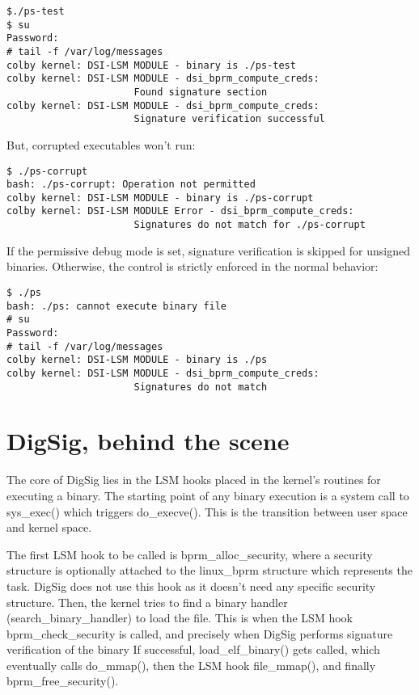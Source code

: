 \documentclass{article}
\begin{document}
\small
\begin{verbatim} 
$./ps-test
$ su
Password:
# tail -f /var/log/messages
colby kernel: DSI-LSM MODULE - binary is ./ps-test
colby kernel: DSI-LSM MODULE - dsi_bprm_compute_creds:
                      Found signature section
colby kernel: DSI-LSM MODULE - dsi_bprm_compute_creds:
                      Signature verification successful
\end{verbatim}
\normalsize

But, corrupted executables won't run:
\small
\begin{verbatim} 
$ ./ps-corrupt
bash: ./ps-corrupt: Operation not permitted 
colby kernel: DSI-LSM MODULE - binary is ./ps-corrupt
colby kernel: DSI-LSM MODULE Error - dsi_bprm_compute_creds:
                      Signatures do not match for ./ps-corrupt
\end{verbatim} 
\normalsize

If the permissive debug mode is set, signature verification is skipped
for unsigned binaries.  Otherwise, the control is strictly enforced in
the normal behavior:

\small
\begin{verbatim} 
$ ./ps
bash: ./ps: cannot execute binary file 
# su 
Password: 
# tail -f /var/log/messages
colby kernel: DSI-LSM MODULE - binary is ./ps
colby kernel: DSI-LSM MODULE - dsi_bprm_compute_creds:
                      Signatures do not match
\end{verbatim}
\normalsize

\section{DigSig, behind the scene}

The core of DigSig lies in the LSM hooks placed in the kernel's
routines for executing a binary. The starting point of any binary
execution is a system call to sys\_exec() which triggers
do\_execve(). This is the transition between user space and kernel
space.

The first LSM hook to be called is bprm\_alloc\_security,
where a security structure is optionally attached to the
linux\_bprm structure which represents the task. DigSig
does not use this hook as it doesn't need any specific
security structure.
Then, the kernel tries to find a binary handler 
(search\_binary\_handler) to load the file. This is
when the LSM hook bprm\_check\_security is called, and precisely
when DigSig performs signature verification of the binary
If successful, load\_elf\_binary() gets called,
which eventually calls do\_mmap(), then the LSM hook
file\_mmap(), and finally bprm\_free\_security().
\end{document}
